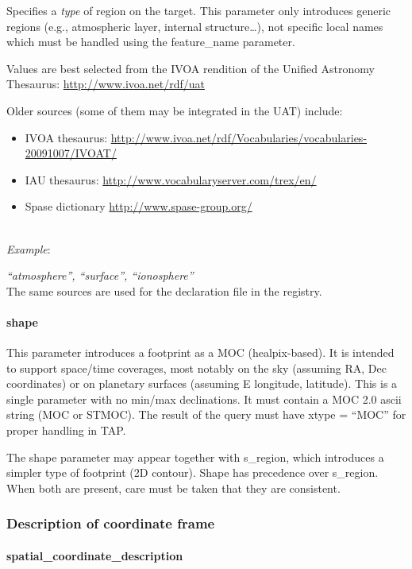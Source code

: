 \documentclass[11pt,a4paper]{ivoa}
\begin{document}
Specifies a \emph{type} of region on the target. This parameter
only introduces generic regions  (e.g., atmospheric layer, internal
structure…), not specific local names which must be handled using the
feature\_name parameter.

Values are best selected from the IVOA
rendition of the Unified Astronomy Thesaurus:
\url{http://www.ivoa.net/rdf/uat}

Older sources (some of them may be integrated in the UAT) include:

\begin{itemize}
\item IVOA thesaurus:
      \url{http://www.ivoa.net/rdf/Vocabularies/vocabularies-20091007/IVOAT/}
\item IAU thesaurus:
      \url{http://www.vocabularyserver.com/trex/en/}
\item Spase dictionary \url{http://www.spase-group.org/}
\end{itemize}

\textbf{\\}
\emph{Example}:

\emph{``atmosphere'', ``surface'', ``ionosphere''}\\
The same sources are used for the declaration file in the registry.

\paragraph{shape}

This parameter introduces a footprint as a MOC (healpix-based).
It is intended to support space/time coverages, most notably on the sky
(assuming RA, Dec coordinates) or on planetary surfaces (assuming
E longitude, latitude). This is a single parameter with no min/max
declinations. It must contain a MOC 2.0 ascii string (MOC or STMOC).
The result of the query must have xtype = ``MOC''
for proper handling in TAP.

The shape parameter may appear together with s\_region, which introduces
a simpler type of footprint (2D contour). Shape has precedence over
s\_region. When both are present, care must be taken that they are
consistent.

\subsubsection{Description of coordinate frame}

\paragraph{spatial\_coordinate\_description}
\end{document}
